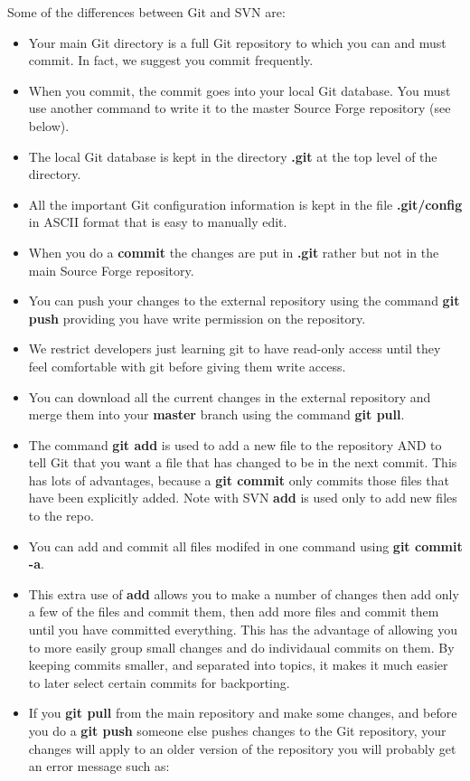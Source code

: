 Some of the differences between Git and SVN are:
\begin{itemize}
\item Your main Git directory is a full Git repository to which you can
  and must commit. In fact, we suggest you commit frequently.
\item When you commit, the commit goes into your local Git
  database.  You must use another command to write it to the
  master Source Forge repository (see below).
\item The local Git database is kept in the directory {\bf .git} at the 
  top level of the directory.
\item All the important Git configuration information is kept in the
  file {\bf .git/config} in ASCII format that is easy to manually edit.
\item When you do a {\bf commit} the changes are put in {\bf .git}
  rather but not in the main Source Forge repository.
\item You can push your changes to the external repository using
  the command {\bf git push} providing you have write permission
  on the repository.
\item We restrict developers just learning git to have read-only
  access until they feel comfortable with git before giving them
  write access.
\item You can download all the current changes in the external repository
  and merge them into your {\bf master} branch using the command
  {\bf git pull}.
\item The command {\bf git add} is used to add a new file to the
  repository AND to tell Git that you want a file that has changed
  to be in the next commit.  This has lots of advantages, because
  a {\bf git commit} only commits those files that have been 
  explicitly added.  Note with SVN {\bf add} is used only
  to add new files to the repo.
\item You can add and commit all files modifed in one command
  using {\bf git commit -a}.
\item This extra use of {\bf add} allows you to make a number
  of changes then add only a few of the files and commit them,
  then add more files and commit them until you have committed
  everything. This has the advantage of allowing you to more
  easily group small changes and do individaual commits on them.
  By keeping commits smaller, and separated into topics, it makes
  it much easier to later select certain commits for backporting.
\item If you {\bf git pull} from the main repository and make
  some changes, and before you do a {\bf git push} someone
  else pushes changes to the Git repository, your changes will
  apply to an older version of the repository you will probably
  get an error message such as:


\end{itemize}
